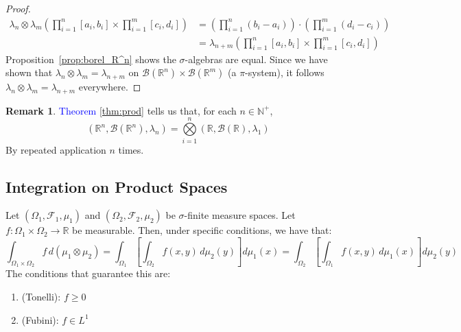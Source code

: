 \documentclass[11pt,a4paper]{article}
\theoremstyle{definition}
\newtheorem{remark}{Remark}[section]
\begin{document}
\begin{proof}
\begin{align*}
\lambda_n \otimes \lambda_m \left ( \prod \limits _{i=1}^n [a_i, b_i] \times \prod \limits _{i=1}^m [c_i, d_i] \right ) & = \left (\prod \limits _{i=1}^n  (b_i - a_i) \right) \cdot \left (\prod \limits _{i=1}^m  (d_i - c_i) \right)
\\ & = \lambda _{n+m} \left (\prod \limits _{i=1}^n [a_i, b_i] \times \prod \limits _{i=1}^m [c_i, d_i] \right)
\end{align*}
Proposition~\ref{prop:borel_R^n} shows the $\sigma$-algebras are equal. Since we have shown that $\lambda_n \otimes \lambda_m = \lambda_{n+m}$ on $\mathcal{B}(\mathbb{R}^n) \times \mathcal{B}(\mathbb{R}^m)$ (a $\pi$-system), it follows $\lambda_n \otimes \lambda_m = \lambda_{n+m}$ everywhere.
\end{proof}

\begin{remark}
\textcolor{blue}{Theorem} \ref{thm:prod} tells us that, for each $n \in \mathbb{N}^+$, \[
\left (\mathbb{R}^n, \mathcal{B}(\mathbb{R}^n), \lambda_n \right) = \bigotimes \limits _{i=1}^n \left ( \mathbb{R}, \mathcal{B}(\mathbb{R}), \lambda_1\right)
\]
By repeated application $n$ times.
\end{remark}
\subsection{Integration on Product Spaces}
Let $(\Omega_1, \mathcal{F}_1, \mu_1)$ and $(\Omega_2, \mathcal{F}_2, \mu_2)$ be $\sigma$-finite measure spaces.
Let $f : \Omega_1 \times \Omega_2 \to \mathbb{R}$ be measurable. Then, under specific conditions, we have that:
\[\int_{\Omega_1 \times \Omega_2} f \, d(\mu_1 \otimes \mu_2) = \int_{\Omega_1} \left[\int_{\Omega_2} f(x,y) \, d\mu_2(y)\right] d\mu_1(x) = \int_{\Omega_2} \left[\int_{\Omega_1} f(x,y) \, d\mu_1(x)\right] d\mu_2(y)\] 
The conditions that guarantee this are:
\begin{enumerate}
\item (Tonelli): $f \geq 0$
\item (Fubini): $f \in L^1$
\end{enumerate}
\end{document}
